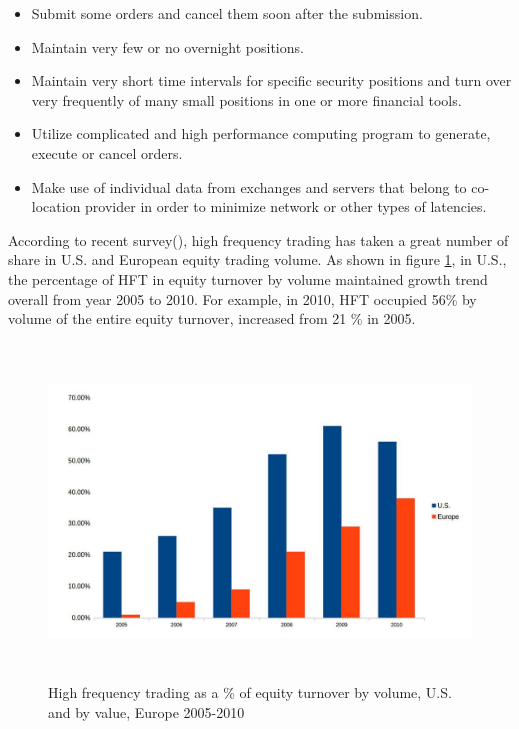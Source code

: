 \begin{itemize}
\item Submit some orders and cancel them soon after the submission.
\item Maintain very few or no overnight positions. 
\item Maintain very short time intervals for specific security positions and turn over very frequently of many small positions in one or more financial tools.
\item Utilize complicated and high performance computing program to generate, execute or cancel orders.
\item Make use of individual data from exchanges and servers that belong to co-location provider in order to minimize network or other types of latencies. 
\end{itemize}

According to recent survey(\cite{hft_future}), high frequency trading has taken a great number of share in U.S. and European equity trading volume. As shown in figure \ref{fig.1}, in U.S., the percentage of HFT in equity turnover by volume maintained growth trend overall from year 2005 to 2010. For example, in 2010, HFT occupied 56\% by volume of the entire equity turnover, increased from 21 \% in 2005. 

\begin{figure}[hbtp]
  \begin{center}
    \includegraphics[width=6.5in,height=3.5in]{figures/hft_percentage.jpg}
  \end{center}
\caption{High frequency trading as a \% of equity turnover by volume, U.S. and by value, Europe 2005-2010} \label{fig.1}
\end{figure}

